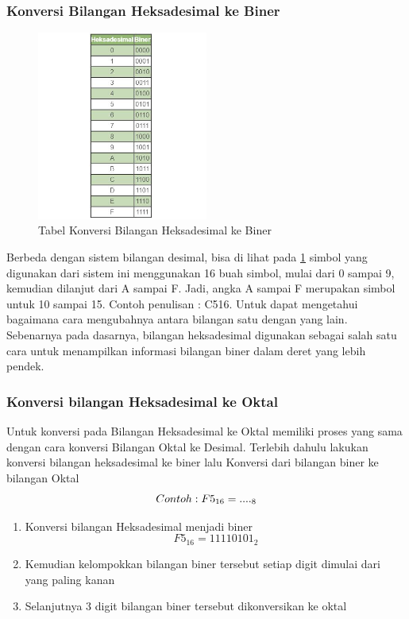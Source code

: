 \subsubsection{Konversi Bilangan Heksadesimal ke Biner}
\begin{figure}[ht]
\centerline{\includegraphics[width=0.5\textwidth]{figures/konversiheksa.JPG}}
\caption{Tabel Konversi Bilangan Heksadesimal ke Biner}
\label{heksakebiner}
\end{figure}
Berbeda dengan sistem bilangan desimal, bisa di lihat pada \ref{heksakebiner} simbol yang digunakan dari sistem ini menggunakan 16 buah simbol, mulai dari 0 sampai 9, kemudian dilanjut dari A sampai F. Jadi, angka A sampai F merupakan simbol untuk 10 sampai 15. Contoh penulisan : C516.
Untuk dapat mengetahui bagaimana cara mengubahnya antara bilangan satu dengan yang lain. Sebenarnya pada dasarnya, bilangan heksadesimal digunakan sebagai salah satu cara untuk menampilkan informasi bilangan biner dalam deret yang lebih pendek.

\subsubsection{Konversi bilangan Heksadesimal ke Oktal}
Untuk konversi pada Bilangan Heksadesimal ke Oktal memiliki proses yang sama dengan cara konversi Bilangan Oktal ke Desimal. Terlebih dahulu lakukan konversi bilangan heksadesimal ke biner lalu Konversi dari bilangan biner ke bilangan Oktal
\begin{equation}
\\Contoh : F5_{16} = ...._{8}
\end{equation}
\begin{enumerate}
\item Konversi bilangan Heksadesimal menjadi biner \begin{equation}F5_{16} = 1111 0101_{2}\end{equation}
\item Kemudian kelompokkan bilangan biner tersebut setiap digit dimulai dari yang paling kanan
\item Selanjutnya 3 digit bilangan biner tersebut dikonversikan ke oktal
\end{enumerate}

